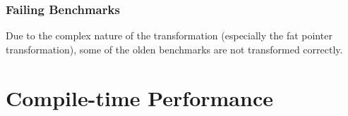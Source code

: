 \subsubsection{Failing Benchmarks}

Due to the complex nature of the transformation (especially the fat pointer transformation), some of the olden benchmarks are not transformed correctly.


%
%
%
%

\section{Compile-time Performance}

